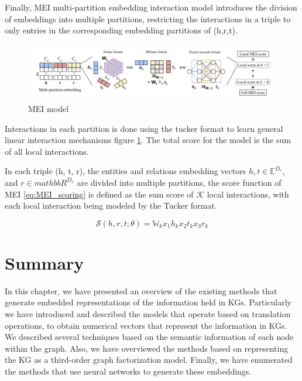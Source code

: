 Finally, MEI \cite{} multi-partition embedding interaction model introduces the division of embeddings into multiple partitions, restricting the interactions in a triple to only entries in the corresponding embedding partitions of (h,r,t).

\begin{figure}[!ht]
    \centering
    \includegraphics[width=\textwidth]{fig/embeddings/MEI.png}
    \caption{MEI model}
    \label{fig:emb-MEI}
\end{figure}

Interactions in each partition is done using the tucker format\cite{} to learn general linear interaction mechanisms figure \ref{fig:emb-MEI}. The total score for the model is the sum of all local interactions. 

In each triple (h, t, r), the entities and relations embedding vectors $h, t \in \mathbb{E}^{D_e}$, and $r \in mathbb{R}^{D_r}$ are divided into multiple partitions, the score function of MEI \ref{eq:MEI_scoring} is defined as the sum score of $\mathcal{K}$ local interactions, with each local interaction being modeled by the Tucker format.

\begin{equation}
    \label{eq:MEI_scoring}
    \mathcal{S}(h, r, t; \theta) = \mathbb{W}_k x_1 h_k x_2 t_k x_3 r_k
\end{equation}

\section{Summary}\label{sec:emb-summary}
In this chapter, we have presented an overview of the existing methods that generate embedded representations of the information held in KGs. Particularly we have introduced and described the models that operate based on translation operations, to obtain numerical vectors that represent the information in KGs. We described several techniques based on the semantic information of each node within the graph. Also, we have overviewed the methods based on representing the KG as a third-order graph factorization model. Finally, we have enumerated the methods that use neural networks to generate these embeddings.